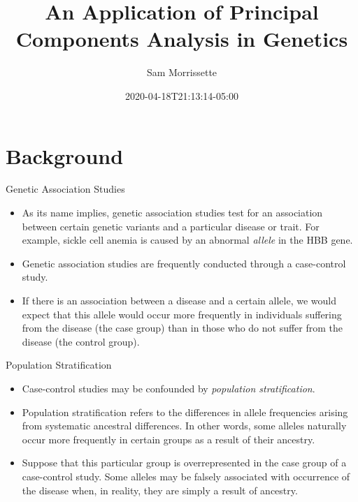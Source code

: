 \documentclass[ignorenonframetext,]{beamer}
\title{An Application of Principal Components Analysis in Genetics}
\author{Sam Morrissette}
\date{2020-04-18T21:13:14-05:00}
\providecommand{\tightlist}{%
  \setlength{\itemsep}{0pt}\setlength{\parskip}{0pt}}
\begin{document}
\frame{\titlepage}

\begin{frame}
\tableofcontents[hideallsubsections]
\end{frame}
\hypertarget{background}{%
\section{Background}\label{background}}

\begin{frame}{Genetic Association Studies}
\protect\hypertarget{genetic-association-studies}{}

\begin{itemize}
\item
  As its name implies, genetic association studies test for an
  association between certain genetic variants and a particular disease
  or trait. For example, sickle cell anemia is caused by an abnormal
  \emph{allele} in the HBB gene.
\item
  Genetic association studies are frequently conducted through a
  case-control study.
\item
  If there is an association between a disease and a certain allele, we
  would expect that this allele would occur more frequently in
  individuals suffering from the disease (the case group) than in those
  who do not suffer from the disease (the control group).
\end{itemize}

\end{frame}

\begin{frame}{Population Stratification}
\protect\hypertarget{population-stratification}{}

\begin{itemize}
\tightlist
\item
  Case-control studies may be confounded by \emph{population
  stratification}.
\item
  Population stratification refers to the differences in allele
  frequencies arising from systematic ancestral differences. In other
  words, some alleles naturally occur more frequently in certain groups
  as a result of their ancestry.
\item
  Suppose that this particular group is overrepresented in the case
  group of a case-control study. Some alleles may be falsely associated
  with occurrence of the disease when, in reality, they are simply a
  result of ancestry.
\end{itemize}

\end{frame}
\end{document}
